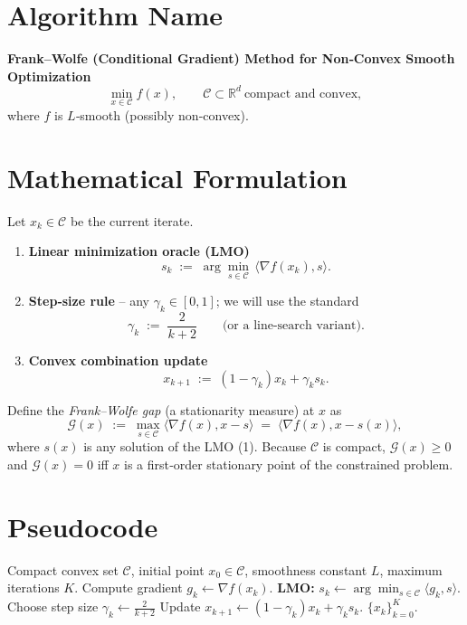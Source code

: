 \documentclass{article}
\newcommand{\gap}{\mathcal{G}}
\begin{document}
\section*{Algorithm Name}
\textbf{Frank–Wolfe (Conditional Gradient) Method for Non‑Convex Smooth Optimization}
\[
\min_{x\in\mathcal C} f(x),\qquad 
\mathcal C\subset\mathbb R^{d}\ \text{compact and convex},
\]
where $f$ is $L$‑smooth (possibly non‑convex).

\section*{Mathematical Formulation}
Let $x_k\in\mathcal C$ be the current iterate.  
\begin{enumerate}[label=\arabic*.]
\item \textbf{Linear minimization oracle (LMO)}  
\[
s_k \;:=\; \arg\min_{s\in\mathcal C}\,\langle \nabla f(x_k),s\rangle .
\tag{1}
\]
\item \textbf{Step‑size rule} – any $\gamma_k\in[0,1]$; we will use the standard
\[
\gamma_k \;:=\; \frac{2}{k+2}\qquad\text{(or a line‑search variant).}
\tag{2}
\]
\item \textbf{Convex combination update}  
\[
x_{k+1}\;:=\;(1-\gamma_k)x_k+\gamma_k s_k .
\tag{3}
\]
\end{enumerate}
Define the \emph{Frank–Wolfe gap} (a stationarity measure) at $x$ as
\[
\gap(x)\;:=\;\max_{s\in\mathcal C}\langle \nabla f(x),x-s\rangle
          \;=\;\langle \nabla f(x),x-s(x)\rangle ,
\tag{4}
\]
where $s(x)$ is any solution of the LMO (1). Because $\mathcal C$ is compact,
$\gap(x)\ge0$ and $\gap(x)=0$ iff $x$ is a first‑order stationary point of the
constrained problem.

\section*{Pseudocode}
\begin{algorithm}[H]
\caption{Frank–Wolfe for non‑convex smooth $f$}
\label{alg:FW}
\begin{algorithmic}[1]
\REQUIRE Compact convex set $\mathcal C$, initial point $x_0\in\mathcal C$,
          smoothness constant $L$, maximum iterations $K$.
    \STATE Compute gradient $g_k \gets \nabla f(x_k)$.
    \STATE \textbf{LMO:} $s_k \gets \arg\min_{s\in\mathcal C}\langle g_k,s\rangle$.
    \STATE Choose step size $\displaystyle\gamma_k \gets \frac{2}{k+2}$ 
            \hfill{}
    \STATE Update $x_{k+1} \gets (1-\gamma_k)x_k + \gamma_k s_k$.
\ENDFOR
\RETURN $\{x_k\}_{k=0}^{K}$.
\end{algorithmic}
\end{algorithm}
\end{document}
